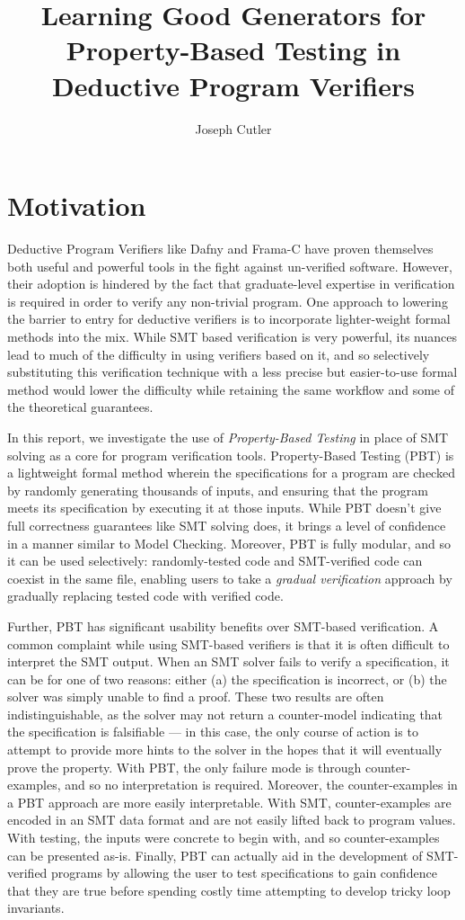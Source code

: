 \documentclass[10pt,a4paper]{article}
\title{Learning Good Generators for Property-Based Testing in Deductive Program Verifiers}
\author{Joseph Cutler}
\begin{document}
\maketitle

\section{Motivation}
Deductive Program Verifiers like Dafny and Frama-C have proven themselves both useful and powerful tools in the fight against un-verified software.
However, their adoption is hindered by the fact that graduate-level expertise in verification is required in order to verify any non-trivial program. One approach to lowering the barrier to entry for deductive verifiers is to incorporate lighter-weight formal methods into the mix. While SMT based verification is very powerful, its nuances lead to much of the difficulty in using verifiers based on it, and so selectively substituting this verification technique with a less precise but easier-to-use formal method would lower the difficulty while retaining the same workflow and some of the theoretical guarantees.

In this report, we investigate the use of \textit{Property-Based Testing} in place of SMT solving as a core for program verification tools. Property-Based Testing (PBT) is a lightweight formal method wherein the specifications for a program are checked by randomly generating thousands of inputs, and ensuring that the program meets its specification by executing it at those inputs. While PBT doesn't give full correctness guarantees like SMT solving does, it brings a level of confidence in a manner similar to Model Checking. Moreover, PBT is fully modular, and so it can be used selectively: randomly-tested code and SMT-verified code can coexist in the same file, enabling users to take a \textit{gradual verification} approach by gradually replacing tested code with verified code.

Further, PBT has significant usability benefits over SMT-based verification. A common complaint while using SMT-based verifiers is that it is often difficult to interpret the SMT output. When an SMT solver fails to verify a specification, it can be for one of two reasons: either (a) the specification is incorrect, or (b) the solver was simply unable to find a proof. These two results are often indistinguishable, as the solver may not return a counter-model indicating that the specification is falsifiable --- in this case, the only course of action is to attempt to provide more hints to the solver in the hopes that it will eventually prove the property. With PBT, the only failure mode is through counter-examples, and so no interpretation is required. Moreover, the counter-examples in a PBT approach are more easily interpretable. With SMT, counter-examples are encoded in an SMT data format and are not easily lifted back to program values. With testing, the inputs were concrete to begin with, and so counter-examples can be presented as-is. Finally, PBT can actually aid in the development of SMT-verified programs by allowing the user to test specifications to gain confidence that they are true before spending costly time attempting to develop tricky loop invariants.
\end{document}
